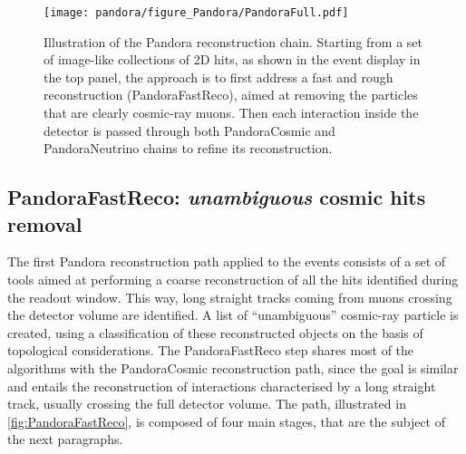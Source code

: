 
\begin{figure}[p]
    \centering
    \texttt{[image: pandora/figure\_Pandora/PandoraFull.pdf]}
    \caption[Overview of the Pandora reconstruction chain]{Illustration of the Pandora reconstruction chain. Starting from a set of image-like collections of 2D hits, as shown in the event display in the top panel, the approach is to first address a fast and rough reconstruction (PandoraFastReco), aimed at removing the particles that are clearly cosmic-ray muons. Then each interaction inside the detector is passed through both PandoraCosmic and PandoraNeutrino chains to refine its reconstruction. }
    \label{fig:pandora}
\end{figure}

\subsection{PandoraFastReco: \emph{unambiguous} cosmic hits removal} \label{sec:fast_reco}

The first Pandora reconstruction path applied to the events consists of a set of tools aimed at performing a coarse reconstruction of all the hits identified during the readout window. This way, long straight tracks coming from muons crossing the detector volume are identified. A list of ``unambiguous'' cosmic-ray particle is created, using a classification of these reconstructed objects on the basis of topological considerations. The PandoraFastReco step shares most of the algorithms with the PandoraCosmic reconstruction path, since the goal is similar and entails the reconstruction of interactions characterised by a long straight track, usually crossing the full detector volume. The path, illustrated in \autoref{fig:PandoraFastReco}, is composed of four main stages, that are the subject of the next paragraphs. 

